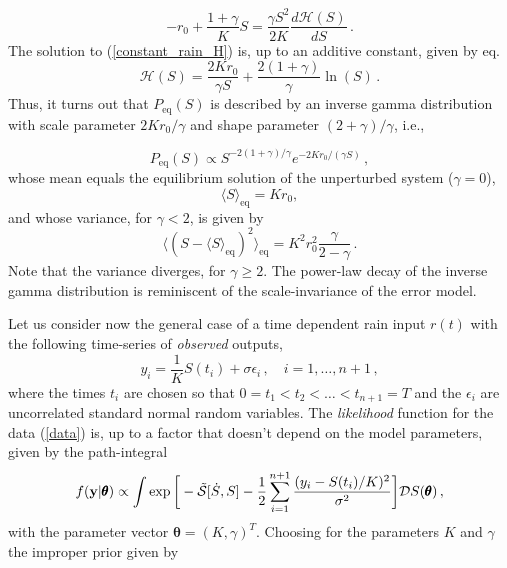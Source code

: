 \documentclass[11pt, a4paper]{article}
\newcommand{\vc}[1]{{\bf #1 }}
\newcommand{\bt}{\pmb\theta}
\newcommand{\eq}{\text{eq}}
\begin{document}
\begin{equation}\label{constant_rain_H}
-r_{0}+\frac{1+\gamma}{K}S
=
\frac{\gamma S^2}{2K}
\frac{d \mathcal{H}(S)}{dS}\,.
\end{equation}
The solution to (\ref{constant_rain_H}) is, up to an additive constant, given by eq.
\begin{equation}\label{solution_const_rain}
\mathcal{H}(S)=\frac{2 K r_0}{\gamma S}+\frac{2(1+\gamma)}{\gamma}\ln(S)\,.
\end{equation}
Thus, it turns out that $P_{\text{eq}}(S)$ is described by an inverse gamma distribution with scale parameter $2Kr_{0}/\gamma$ and shape parameter $(2+\gamma)/\gamma$, i.e.,

\begin{equation}\label{inverse_gamma}
  P_{\text{eq}}(S)
  \propto
  S^{-2(1+\gamma)/\gamma}e^{-2Kr_{0}/(\gamma S)}\,,
\end{equation}
whose mean equals the equilibrium solution of the unperturbed system ($\gamma=0$),
\begin{equation}
  \langle S\rangle_{\eq}=Kr_{0},
\end{equation}
and whose variance, for $\gamma< 2$, is given by
\begin{equation}
  \langle (S - \langle S\rangle_{\eq})^2\rangle_{\eq}
  =
  K^2r_{0}^2
  \frac{\gamma}{2-\gamma}\,.
\end{equation}
Note that the variance diverges, for $\gamma\geq 2$.
The power-law decay of the inverse gamma distribution is reminiscent of the scale-invariance of the error model.

Let us consider now the general case of a time dependent rain input $r(t)$ with the following time-series of {\em observed} outputs,
\begin{equation}\label{data}
  y_i=\frac{1}{K}S(t_i)+\sigma\epsilon_i\,,\quad i=1,\dots,n+1\,,
\end{equation}
where the times $t_i$ are chosen so that $0=t_1<t_2<\dots < t_{n+1}=T$ and the $\epsilon_i$ are uncorrelated standard normal random variables.
The {\em likelihood} function for the data (\ref{data}) is, up to a factor that doesn't depend on the model parameters, given by the path-integral
\begin{equation}\label{likelihood}
  f(\vc y | \bt)
  \propto
  \int
  \exp\bigg[
    -{\tilde{\mathcal S}}[\dot{S},S]
    -\frac{1}{2}
    \sum_{i=1}^{n+1}
    \frac
    {(y_i-S(t_i)/K)^2}
    {\sigma^2}
  \bigg]
  {\mathcal D} S(\bt)\,,
\end{equation}
with the parameter vector $\bt=(K,\gamma)^T$.
Choosing for the parameters $K$ and $\gamma$ the improper prior given by
\end{document}
